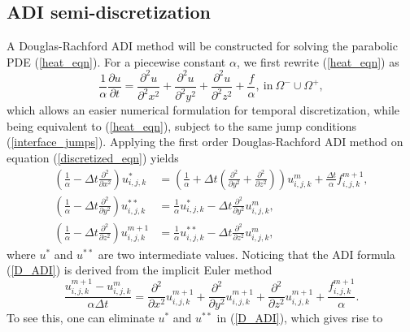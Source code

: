 \documentclass[dissertation]{uathesis}
\begin{document}
\begin{body}
\begin{flushleft}
\section{ADI semi-discretization}
\hspace{1cm} A Douglas-Rachford ADI method \cite{douglas1955numerical2, paeceman1955numerical} will be constructed for solving the parabolic PDE (\ref{heat_eqn}).
For a piecewise constant $\alpha$, we first rewrite (\ref{heat_eqn}) as
%
\begin{equation} \label{discretized_eqn}
\frac{1}{\alpha} \frac{\partial u}{\partial t} = \frac{\partial^{2} u}{\partial^{2} x^{2}} + \frac{\partial^{2} u}{\partial^{2} y^{2}} + \frac{\partial^{2} u}{\partial^{2} z^{2}} + \frac{f}{\alpha},   ~ \mbox{in} ~ \Omega^{-}\cup\Omega^{+},
\end{equation}
%
which allows an easier numerical formulation for temporal discretization, while being
equivalent to (\ref{heat_eqn}), subject to the same jump conditions (\ref{interface_jumps}).
Applying the first order Douglas-Rachford ADI method on equation (\ref{discretized_eqn}) yields
%
\begin{align} \label{D_ADI}
(\frac{1}{\alpha}-\Delta t \frac{\partial^2}{\partial x^2}) u^{*}_{i,j,k}   &= (\frac{1}{\alpha} + \Delta t (\frac{\partial^2}{\partial y^2} + \frac{\partial^2}{\partial z^2})) u^{m}_{i,j,k} + \frac{\Delta t}{\alpha} f^{m+1}_{i,j,k}, \nonumber \\
(\frac{1}{\alpha}-\Delta t \frac{\partial^2}{\partial y^2}) u^{**}_{i,j,k}  &= \frac{1}{\alpha} u^{*}_{i,j,k} - \Delta t \frac{\partial^2}{\partial y^2} u^{m}_{i,j,k},  \\
(\frac{1}{\alpha}-\Delta t \frac{\partial^2}{\partial z^2}) u^{m+1}_{i,j,k} &= \frac{1}{\alpha} u^{**}_{i,j,k} - \Delta t \frac{\partial^2}{\partial z^2} u^{m}_{i,j,k}, \nonumber
\end{align}
%
where $u^{*}$ and $u^{**}$ are two intermediate values. Noticing that the ADI formula (\ref{D_ADI}) is derived from the implicit Euler method
%
\begin{equation} \label{implicit_Euler}
\frac{u^{m+1}_{i,j,k}-u^{m}_{i,j,k}}{\alpha \Delta t} = \frac{\partial^2}{\partial x^2} u^{m+1}_{i,j,k} + \frac{\partial^2}{\partial y^2} u^{m+1}_{i,j,k} + \frac{\partial^2}{\partial z^2} u^{m+1}_{i,j,k} + \frac{f^{m+1}_{i,j,k}}{\alpha}.
\end{equation}
%
To see this, one can eliminate $u^{*}$ and $u^{**}$ in (\ref{D_ADI}), which gives rise to

\end{flushleft}
\end{body}
\end{document}

